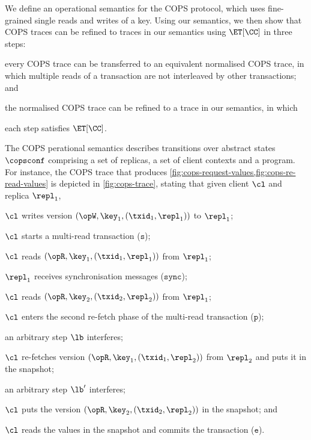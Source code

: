 We define an operational semantics for the COPS protocol, which uses  fine-grained single reads and writes of a key.
Using our semantics, we then show that COPS traces can be refined to traces in our semantics using \( \ET[\CC] \) in three steps:
\begin{enumerate*}
	\item every COPS trace can be transferred to an  equivalent normalised COPS trace, 
in which multiple reads of a transaction are not interleaved by other transactions; and
	\item the normalised COPS trace can be refined to a trace in our semantics, in which 
	\item each step satisfies \( \ET[\CC] \).
\end{enumerate*}

The COPS perational semantics
describes transitions over abstract states \( \copsconf \) comprising a set of replicas,
a set of client contexts and a program.
For instance, the COPS trace that produces \cref{fig:cops-request-values,fig:cops-re-read-values} is depicted in \cref{fig:cops-trace}, stating that
given client \(\cl\) and replica \( \repl_1 \),
\begin{enumerate*}
	\item \( \cl \) writes version \( (\opW,\key_1, (\txid_1,\repl_1)) \) to $\repl_1$;
	\item \( \cl \) starts a multi-read transaction (\( \mathtt{s} \));
	\item \( \cl \) reads \( (\opR,\key_1, (\txid_1,\repl_1)) \) from $\repl_1$;
	\item \( \repl_1 \) receives synchronisation messages (\(\mathtt{sync}\));
	\item \( \cl \) reads \( (\opR,\key_2, (\txid_2,\repl_2)) \) from $\repl_1$;
	\item \( \cl \) enters the second re-fetch phase of the multi-read transaction (\(\mathtt{p}\));
	\item an arbitrary step \( \lb \) interferes;
	\item \( \cl \) re-fetches version \( (\opR,\key_1, (\txid_1,\repl_2)) \) from \( \repl_2 \) and puts it in the snapshot;
	\item an arbitrary step \( \lb' \) interferes;
	\item \( \cl \) puts the version \( (\opR,\key_2, (\txid_2,\repl_2)) \) in the snapshot; and
	\item \( \cl \) reads the values in the snapshot and commits the transaction (\(\mathtt{e}\)).
\end{enumerate*}


